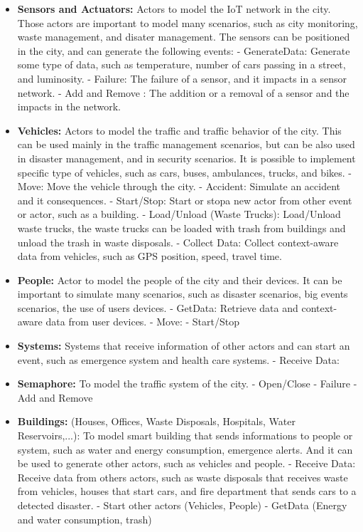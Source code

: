\documentclass[
journal=jacsat, %
manuscript=article]{achemso}
\begin{document}
\begin{itemize}

\item \textbf{Sensors and Actuators:} Actors to model the IoT network in the city. Those actors are important to model many scenarios, such as city monitoring, waste management, and disater management. The sensors  can be positioned in the city, and can generate the following events:
	- GenerateData: Generate some type of data, such as temperature, number of 	cars passing in a street, and luminosity.
	- Failure: The failure of a sensor, and it impacts in a sensor network.
	- Add and Remove	: The addition or a removal of a sensor and the impacts in 	the network.

\item \textbf{Vehicles:} Actors to model the traffic and traffic behavior of the city. This can be used mainly in the traffic management scenarios, but can be also used in disaster management, and in security scenarios. It is possible to implement specific type of vehicles, such as cars, buses, ambulances, trucks, and bikes.
	- Move: Move the vehicle through the city.
	- Accident: Simulate an accident and it consequences.
	- Start/Stop: Start or stopa new actor from other event or actor, such as a building.
	- Load/Unload (Waste Trucks): Load/Unload waste trucks, the waste trucks can be loaded with trash from buildings and unload the trash in waste disposals.
	- Collect Data: Collect context-aware data from vehicles, such as  GPS position, speed, travel time.
\item \textbf{People:} Actor to model the people of the city and their devices. It can be important to simulate many scenarios, such as disaster scenarios, big events scenarios, the use of users devices.
	- GetData: Retrieve data and context-aware data from user devices.
	- Move: 
	- Start/Stop
	
\item \textbf{Systems:} Systems that receive information of other actors and can start an event, such as emergence system and health care systems.
	- Receive Data:
	
\item \textbf{Semaphore:} To model the traffic system of the city.
	- Open/Close
	- Failure
	- Add and Remove
	
\item \textbf{Buildings:} (Houses, Offices, Waste Disposals, Hospitals, Water Reservoirs,...): To model smart building that sends informations to people or system, such as water and energy consumption, emergence alerts. And it can be used to generate other actors, such as vehicles and people.
	- Receive Data: Receive data from others actors, such as waste disposals that receives waste from vehicles, houses that start cars, and fire department that sends cars to a detected disaster.
	- Start other actors (Vehicles, People)
	- GetData (Energy and water consumption, trash)


\end{itemize}
\end{document}
